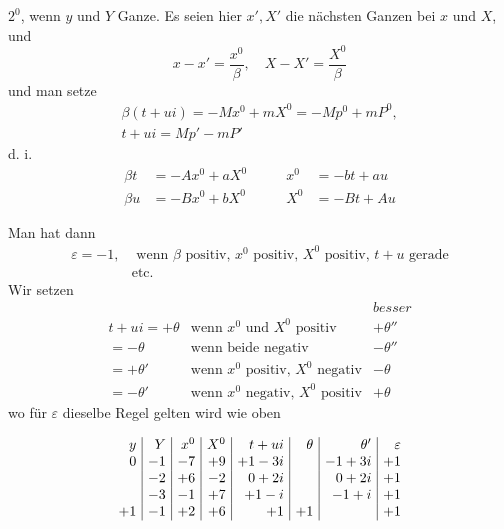$2^0$, wenn $y$ und $Y$ Ganze. Es seien hier $x',X'$ die nächsten Ganzen bei $x$ und $X$, und
\[
x-x'=\frac{x^0}{\beta},\quad X-X'=\frac{X^0}{\beta}
\]
und man setze
\[
\begin{gathered}
\beta(t+ui)=-Mx^0+mX^0=-Mp^0+mP^0,\\
t+ui=Mp'-mP'
\end{gathered}
\]
d. i.
\[
\begin{alignedat}{2}
\beta t&=-Ax^0+aX^0\qquad&x^0&=-bt+au\\
\beta u&=-Bx^0+bX^0&X^0&=-Bt+Au
\end{alignedat}
\]

Man hat dann
\[
\begin{aligned}
\varepsilon=-1,&\text{ wenn }\beta\text{ positiv, }x^0\text{ positiv, }X^0\text{ positiv, }t+u\text{ gerade}\\
&\text{etc.}
\end{aligned}
\]
Wir setzen
\[
\begin{array}{rll}
&&\textit{besser}\\
t+ui=+\theta&\text{wenn }x^0\text{ und }X^0\text{ positiv}&+\theta''\\
=-\theta&\text{wenn beide negativ}&-\theta''\\
=+\theta'&\text{wenn }x^0\text{ positiv, }X^0\text{ negativ}&-\theta\\
=-\theta'&\text{wenn }x^0\text{ negativ, }X^0\text{ positiv}&+\theta
\end{array}
\]
wo für $\varepsilon$ dieselbe Regel gelten wird wie oben

\[
\setlength{\arraycolsep}{4pt}
\begin{array}{r|r|r|r|r|r|r|r}
y&Y&x^0&X^0&t+ui&\theta&\theta'&\varepsilon\\
0&-1&-7&+9&+1-3i&&-1+3i&+1\\
&-2&+6&-2&0+2i&&0+2i&+1\\
&-3&-1&+7&+1-i&&-1+i&+1\\
+1&-1&+2&+6&+1&+1&&+1
\end{array}
\]

